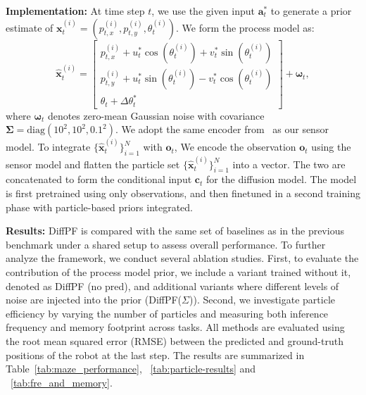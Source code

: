 \textbf{Implementation:} At time step $t$, we use the given input $\bm{a}_t^*$ to generate a prior estimate of $\bm{x}_{t}^{(i)}=(p_{t,x}^{(i)}, p_{t,y}^{(i)}, \theta_t^{(i)})$. We form the process model as:
\begin{equation}
\bm{\hat{x}}_{t}^{(i)} =
\begin{bmatrix}
p_{t,x}^{(i)} + u_t^* \cos(\theta_t^{(i)}) + v_t^* \sin(\theta_t^{(i)}) \\
p_{t,y}^{(i)} + u_t^* \sin(\theta_t^{(i)}) - v_t^* \cos(\theta_t^{(i)}) \\
\theta_t + \Delta \theta_t^*
\end{bmatrix}
+ \bm{\omega}_t ,
\end{equation}
where \( \bm \omega_t \) denotes zero-mean Gaussian noise with covariance \( \mathbf{\Sigma} = \mathrm{diag}(10^2, 10^2, 0.1^2) \). We adopt the same encoder from~\cite{chen2024normalizing} as our sensor model. To integrate $\{\hat{\bm{x}}_t^{(i)}\}_{i=1}^N$ with $\bm o_t$, We encode the observation \( \bm o_t \) using the sensor model and flatten the particle set \( \{\hat{\bm{x}}_t^{(i)}\}_{i=1}^N \) into a vector. The two are concatenated to form the conditional input \( \bm{c}_t \) for the diffusion model.
The model is first pretrained using only observations, and then finetuned in a second training phase with particle-based priors integrated.

\textbf{Results:} 
DiffPF is compared with the same set of baselines as in the previous benchmark under a shared setup to assess overall performance. 
To further analyze the framework, we conduct several ablation studies. 
First, to evaluate the contribution of the process model prior, we include a variant trained without it, denoted as DiffPF (no pred), and additional variants where different levels of noise are injected into the prior (DiffPF($\Sigma$)). 
Second, we investigate particle efficiency by varying the number of particles and measuring both inference frequency and memory footprint across tasks.
All methods are evaluated using the root mean squared error (RMSE) between the predicted and ground-truth positions of the robot at the last step. 
The results are summarized in Table~\ref{tab:maze_performance}, ~\ref{tab:particle-results} and ~\ref{tab:fre_and_memory}.

